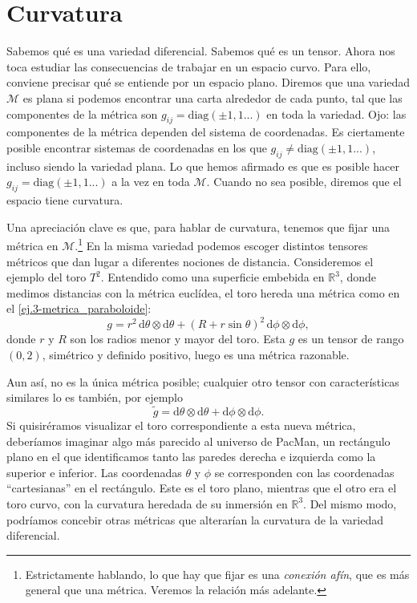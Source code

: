 \newpage
\section{Curvatura}
\label{sec.4curvatura}

Sabemos qué es una variedad diferencial. Sabemos qué es un tensor. Ahora nos toca estudiar las consecuencias de trabajar en un espacio curvo. Para ello, conviene precisar qué se entiende por un espacio plano. Diremos que una variedad \(\mathcal{M}\) es plana si podemos encontrar una carta alrededor de cada punto, tal que las componentes de la métrica son \(g_{ij} = \text{diag}(\pm1, 1...)\) en toda la variedad. Ojo: las componentes de la métrica dependen del sistema de coordenadas. Es ciertamente posible encontrar sistemas de coordenadas en los que \(g_{ij} \neq \text{diag}(\pm1, 1...)\), incluso siendo la variedad plana. Lo que hemos afirmado es que es posible hacer \(g_{ij} = \text{diag}(\pm1, 1...)\) a la vez en toda \(\mathcal{M}\). Cuando no sea posible, diremos que el espacio tiene curvatura.

Una apreciación clave es que, para hablar de curvatura, tenemos que fijar una métrica en \(\mathcal{M}\).\footnote{Estrictamente hablando, lo que hay que fijar es una \emph{conexión afín}, que es más general que una métrica. Veremos la relación más adelante.} En la misma variedad podemos escoger distintos tensores métricos que dan lugar a diferentes nociones de distancia. Consideremos el ejemplo del toro \(T^2\). Entendido como una superficie embebida en \(\mathbb{R}^3\), donde medimos distancias con la métrica euclídea, el toro hereda una métrica como en el \cref{ej.3-metrica_paraboloide}:
\begin{equation}
    g = r^2\,\mathrm{d}\theta\otimes\mathrm{d}\theta + (R+r\sin\theta)^2\,\mathrm{d}\phi\otimes\mathrm{d}\phi,
\end{equation}
donde \(r\) y \(R\) son los radios menor y mayor del toro. Esta \(g\) es un tensor de rango \((0, 2)\), simétrico y definido positivo, luego es una métrica razonable. 

Aun así, no es la única métrica posible; cualquier otro tensor con características similares lo es también, por ejemplo
\begin{equation}
    \tilde{g} = \mathrm{d}\theta\otimes\mathrm{d}\theta + \mathrm{d}\phi\otimes\mathrm{d}\phi.
\end{equation}
Si quisiréramos visualizar el toro correspondiente a esta nueva métrica, deberíamos imaginar algo más parecido al universo de PacMan, un rectángulo plano en el que identificamos tanto las paredes derecha e izquierda como la superior e inferior. Las coordenadas \(\theta\) y \(\phi\) se corresponden con las coordenadas ``cartesianas'' en el rectángulo. Este es el toro plano, mientras que el otro era el toro curvo, con la curvatura heredada de su inmersión en 
\(\mathbb{R}^3\). Del mismo modo, podríamos concebir otras métricas que alterarían la curvatura de la variedad diferencial.

